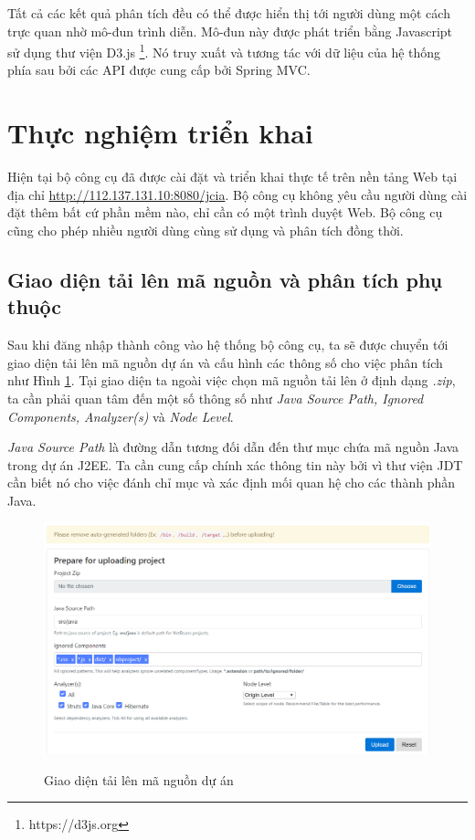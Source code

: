 \documentclass[12pt]{report}
\begin{document}
Tất cả các kết quả phân tích đều có thể được hiển thị tới người dùng một cách trực quan nhờ mô-đun trình diễn. Mô-đun này được phát triển bằng Javascript sử dụng thư viện D3.js \footnote{  https://d3js.org}. Nó truy xuất và tương tác với dữ liệu của hệ thống phía sau bởi các API được cung cấp bởi Spring MVC.

\section{Thực nghiệm triển khai}

Hiện tại bộ công cụ đã được cài đặt và triển khai thực tế trên nền tảng Web tại địa chỉ \url{http://112.137.131.10:8080/jcia}. Bộ công cụ không yêu cầu người dùng cài đặt thêm bất cứ phần mềm nào, chỉ cần có một trình duyệt Web. Bộ công cụ cũng cho phép nhiều người dùng cùng sử dụng và phân tích đồng thời.

\subsection{Giao diện tải lên mã nguồn và phân tích phụ thuộc}
Sau khi đăng nhập thành công vào hệ thống bộ công cụ, ta sẽ được chuyển tới giao diện tải lên mã nguồn dự án và cấu hình các thông số cho việc phân tích như Hình \ref{fig:jcia-upload}. Tại giao diện ta ngoài việc chọn mã nguồn tải lên ở định dạng \textit{.zip}, ta cần phải quan tâm đến một số thông số như \textit{Java Source Path, Ignored Components, Analyzer(s)} và \textit{Node Level}.

\textit{Java Source Path} là đường dẫn tương đối dẫn đến thư mục chứa mã nguồn Java trong dự án J2EE. Ta cần cung cấp chính xác thông tin này bởi vì thư viện JDT cần biết nó cho việc đánh chỉ mục và xác định mối quan hệ cho các thành phần Java.

\begin{figure}[h]
	\centering
	\includegraphics[width=0.9\linewidth]{jcia-upload}
	\label{fig:jcia-upload}
	\caption{Giao diện tải lên mã nguồn dự án}
\end{figure}
\end{document}
